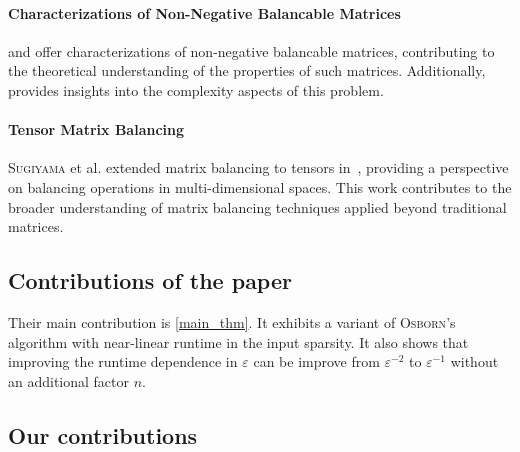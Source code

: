 \paragraph*{Characterizations of Non-Negative Balancable Matrices} \cite{osborne1960pre} and \cite{eaves1985line} offer characterizations of non-negative balancable matrices, contributing to the theoretical understanding of the properties of such matrices. Additionally, \cite{kalantari1997complexity} provides insights into the complexity aspects of this problem.

\paragraph*{Tensor Matrix Balancing} \textsc{Sugiyama} et al. extended matrix balancing to tensors in~\cite{sugiyama2017tensor}, providing a perspective on balancing operations in multi-dimensional spaces. This work contributes to the broader understanding of matrix balancing techniques applied beyond traditional matrices.

\subsection{Contributions of the paper}

Their main contribution is \cref{main_thm}. It exhibits a variant of \textsc{Osborn}'s algorithm with near-linear runtime in the input sparsity. It also shows that improving the runtime dependence in \(\varepsilon\) can be improve from \(\varepsilon^{-2}\) to \(\varepsilon^{-1}\) without an additional factor \(n\).  


\subsection{Our contributions}

